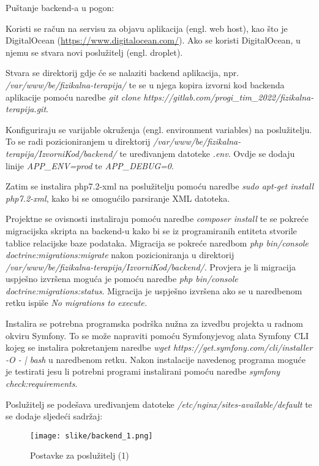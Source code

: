 			Puštanje backend-a u pogon:
			\begin{packed_item}
				\item Koristi se račun na servisu za objavu aplikacija (engl. web host), kao što je DigitalOcean (\url{https://www.digitalocean.com/}). Ako se koristi DigitalOcean, u njemu se stvara novi poslužitelj (engl. droplet).
				\item Stvara se direktorij gdje će se nalaziti backend aplikacija, npr. \textit{/var/www/be/fizikalna-terapija/} te se u njega kopira izvorni kod backenda aplikacije pomoću naredbe \textit{git clone https://gitlab.com/progi\_tim\_2022/fizikalna-terapija.git}.
				\item Konfiguriraju se varijable okruženja (engl. environment variables) na poslužitelju. To se radi pozicioniranjem u direktorij \textit{/var/www/be/fizikalna-terapija/IzvorniKod/backend/} te uređivanjem datoteke \textit{.env}. Ovdje se dodaju linije \textit{APP\_ENV=prod} te \textit{APP\_DEBUG=0}.
				\item Zatim se instalira php7.2-xml na poslužitelju pomoću naredbe \textit{sudo apt-get install php7.2-xml}, kako bi se omogućilo parsiranje XML datoteka.
				\item Projektne se ovisnosti instaliraju pomoću naredbe \textit{composer install} te se pokreće migracijska skripta na backend-u kako bi se iz programiranih entiteta stvorile tablice relacijske baze podataka. Migracija se pokreće naredbom \textit{php bin/console doctrine:migrations:migrate} nakon pozicioniranja u direktorij \textit{/var/www/be/fizikalna-terapija/IzvorniKod/backend/}. Provjera je li migracija uspješno izvršena moguća je pomoću naredbe \textit{php bin/console doctrine:migrations:status}. Migracija je uspješno izvršena ako se u naredbenom retku ispiše \textit{No migrations to execute.}
				\item Instalira se potrebna programska podrška nužna za izvedbu projekta u radnom okviru Symfony. To se može napraviti pomoću Symfonyjevog alata Symfony CLI kojeg se instalira pokretanjem naredbe \textit{wget https://get.symfony.com/cli/installer -O - | bash} u naredbenom retku. Nakon instalacije navedenog programa moguće je testirati jesu li potrebni programi instalirani pomoću naredbe \textit{symfony check:requirements}.
				\item Poslužitelj se podešava uređivanjem datoteke \textit{/etc/nginx/sites-available/default} te se dodaje sljedeći sadržaj:
				
				\begin{figure}[H]
					\texttt{[image: slike/backend\_1.png]} %
					\centering
					\caption{Postavke za poslužitelj (1)}
					\label{fig:nginxconfig1}
				\end{figure}
			

\end{packed_item}
